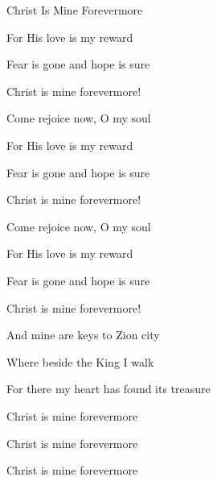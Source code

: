 \documentclass[12pt]{book}
\newcommand{\WBColBrk}{%
  \ifWordBk%
  \newpage%
\fi}
\begin{document}
\begin{song}{Christ Is Mine Forevermore}{}
\begin{SBVerse}
    For His love is my reward

    Fear is gone and hope is sure

    Christ is mine forevermore!

    Come rejoice now, O my soul

    For His love is my reward

    Fear is gone and hope is sure

    Christ is mine forevermore!

    Come rejoice now, O my soul

    For His love is my reward

    Fear is gone and hope is sure

    Christ is mine forevermore!
  \end{SBVerse}
  \begin{SBVerse}
    And mine are keys to Zion city

    Where beside the King I walk

    For there my heart has found its treasure

    Christ is mine forevermore

    Christ is mine forevermore

    Christ is mine forevermore
  \end{SBVerse}

\end{song}

\WBColBrk
\end{document}
